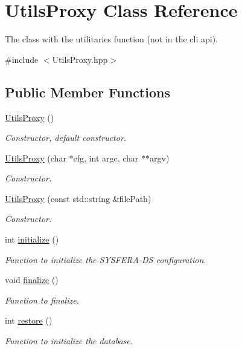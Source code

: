 \hypertarget{classUtilsProxy}{
\section{UtilsProxy Class Reference}
\label{classUtilsProxy}
}


The class with the utilitaries function (not in the cli api).  




{\ttfamily \#include $<$UtilsProxy.hpp$>$}

\subsection*{Public Member Functions}
\begin{DoxyCompactItemize}
\item 
\hypertarget{classUtilsProxy_aaafa5c4ab604c906d313bbeb86fae89d}{
\hyperlink{classUtilsProxy_aaafa5c4ab604c906d313bbeb86fae89d}{UtilsProxy} ()}
\label{classUtilsProxy_aaafa5c4ab604c906d313bbeb86fae89d}

\begin{DoxyCompactList}\small\item\em Constructor, default constructor. \item\end{DoxyCompactList}\item 
\hyperlink{classUtilsProxy_ac5a9f462a23dca72804c9949de07dfb3}{UtilsProxy} (char $\ast$cfg, int argc, char $\ast$$\ast$argv)
\begin{DoxyCompactList}\small\item\em Constructor. \item\end{DoxyCompactList}\item 
\hyperlink{classUtilsProxy_afc7b1c01f7d1129e80d1fe63da23c39c}{UtilsProxy} (const std::string \&filePath)
\begin{DoxyCompactList}\small\item\em Constructor. \item\end{DoxyCompactList}\item 
int \hyperlink{classUtilsProxy_a037ff9b798890eb865cddef7dd9eec94}{initialize} ()
\begin{DoxyCompactList}\small\item\em Function to initialize the SYSFERA-\/DS configuration. \item\end{DoxyCompactList}\item 
void \hyperlink{classUtilsProxy_a2dbe3b111c081b7acf07fcd3e7ee1353}{finalize} ()
\begin{DoxyCompactList}\small\item\em Function to finalize. \item\end{DoxyCompactList}\item 
int \hyperlink{classUtilsProxy_a185d510ddd2ff67d2f4ab60d0a2bffda}{restore} ()
\begin{DoxyCompactList}\small\item\em Function to initialize the database. \item\end{DoxyCompactList}\end{DoxyCompactItemize}
